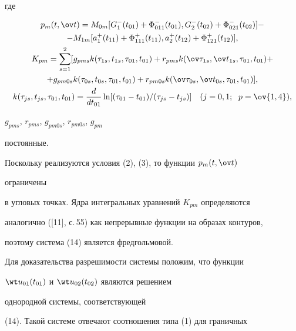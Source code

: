 где 


\begin{gather*} 


p_m(t,\ov t)=M_{0m}[G^-_1(t_{01})+\Phi^-_{011}(t_{01}), 


G^-_2(t_{02})+\Phi^-_{021}(t_{02})]- \\


%


- M_{1m}[a^+_1(t_{11})+\Phi^+_{111}(t_{11}), 


a^+_2(t_{12})+\Phi^+_{121}(t_{12})],\\ 


% 


K_{p m}=\sum^2_{s=1}[g_{p m s}k(\tau_{1s},t_{1s},\tau_{01}, 


t_{01})+r_{p m s}k(\ov\tau_{1s},\ov t_{1s},\tau_{01},t_{01})+ \\


%


+g_{pm0s}k(\tau_{0s},t_{0s},\tau_{01},t_{01})+ 


r_{pm0s}k(\ov\tau_{0s},\ov t_{0s},\tau_{01},t_{01})],\\ 


% 


k(\tau_{js},t_{js},\tau_{01},t_{01})= 


\frac{d}{d t_{01}}\ln[(\tau_{01}-t_{01})/(\tau_{js}-t_{js})] 


\quad (j=0,1;\ \; p=\ov{1,4}), 


\end{gather*} 


$g_{p m s}$, $r_{p ms}$, $g_{pm0s}$, $r_{pm0s}$, $g_{pm}$


постоянные. 


Поскольку реализуются условия (2), (3), то функции $p_m(t,\ov t)$ 


ограничены 


в угловых точках. Ядра интегральных уравнений $K_{pm}$ определяются 


аналогично ([11], с.\,55) как непрерывные функции на образах контуров, 


поэтому система (14) является фредгольмовой. 


 


Для доказательства разрешимости системы положим, что функции 


$\wt u_{01}(t_{01})$ и $\wt u_{02}(t_{02})$ являются решением 


однородной системы, соответствующей 


(14). Такой системе отвечают соотношения типа (1) для граничных 



